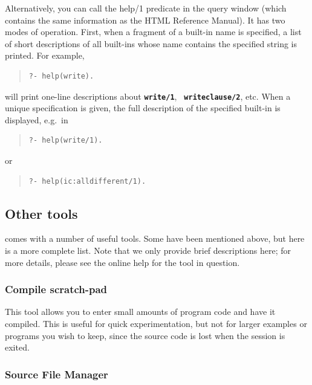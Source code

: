 Alternatively, you can call the help/1 predicate in the query window
(which contains the same information as the HTML Reference Manual).
It has two modes of operation.  First, when a fragment of a built-in
name is specified, a list of short descriptions of all built-ins whose
name contains the specified string is printed.  For example,
\begin{quote}
\begin{verbatim}
?- help(write).
\end{verbatim}
\end{quote}
will print one-line descriptions about {\bf \tt write/1}, {\bf \tt
writeclause/2}, etc.  When a unique specification is given, the full
description of the specified built-in is displayed, e.g.\ in
\begin{quote}
\begin{verbatim}
?- help(write/1).
\end{verbatim}
\end{quote}
or
\begin{quote}
\begin{verbatim}
?- help(ic:alldifferent/1).
\end{verbatim}
\end{quote}


\subsection{Other tools}

{\tkeclipse} comes with a number of useful tools.  Some have been
mentioned above, but here is a more complete list.  Note that we only
provide brief descriptions here; for more details, please see the
online help for the tool in question.

\subsubsection{Compile scratch-pad}

This tool allows you to enter small amounts of program code and have
it compiled.  This is useful for quick experimentation, but not for
larger examples or programs you wish to keep, since the source code is
lost when the session is exited.

\subsubsection{Source File Manager}

